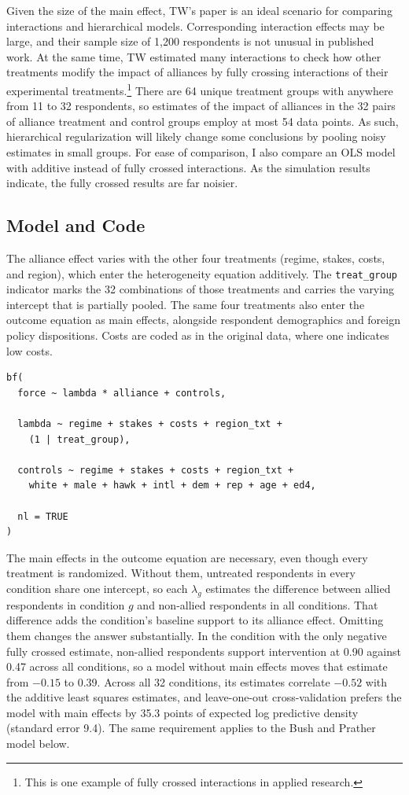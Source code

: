 \documentclass[12pt]{article}
\begin{document}
Given the size of the main effect, TW's paper is an ideal scenario for comparing interactions and hierarchical models. 
Corresponding interaction effects may be large, and their sample size of 1,200 respondents is not unusual in published work. 
At the same time, TW estimated many interactions to check how other treatments modify the impact of alliances by fully crossing interactions of their experimental treatments.\footnote{This is one example of fully crossed interactions in applied research.}
There are 64 unique treatment groups with anywhere from 11 to 32 respondents, so estimates of the impact of alliances in the 32 pairs of alliance treatment and control groups employ at most 54 data points. 
As such, hierarchical regularization will likely change some conclusions by pooling noisy estimates in small groups.
For ease of comparison, I also compare an OLS model with additive instead of fully crossed interactions.
As the simulation results indicate, the fully crossed results are far noisier.



\subsection{Model and Code}

The alliance effect varies with the other four treatments (regime, stakes, costs, and region), which enter the heterogeneity equation additively.
The \verb+treat_group+ indicator marks the 32 combinations of those treatments and carries the varying intercept that is partially pooled.
The same four treatments also enter the outcome equation as main effects, alongside respondent demographics and foreign policy dispositions.
Costs are coded as in the original data, where one indicates low costs.

\begin{verbatim}
bf(
  force ~ lambda * alliance + controls,

  lambda ~ regime + stakes + costs + region_txt +
    (1 | treat_group),

  controls ~ regime + stakes + costs + region_txt +
    white + male + hawk + intl + dem + rep + age + ed4,

  nl = TRUE
)
\end{verbatim}

The main effects in the outcome equation are necessary, even though every treatment is randomized.
Without them, untreated respondents in every condition share one intercept, so each $\lambda_g$ estimates the difference between allied respondents in condition $g$ and non-allied respondents in all conditions.
That difference adds the condition's baseline support to its alliance effect.
Omitting them changes the answer substantially.
In the condition with the only negative fully crossed estimate, non-allied respondents support intervention at 0.90 against 0.47 across all conditions, so a model without main effects moves that estimate from $-0.15$ to 0.39.
Across all 32 conditions, its estimates correlate $-0.52$ with the additive least squares estimates, and leave-one-out cross-validation prefers the model with main effects by 35.3 points of expected log predictive density (standard error 9.4).
The same requirement applies to the Bush and Prather model below.
\end{document}
